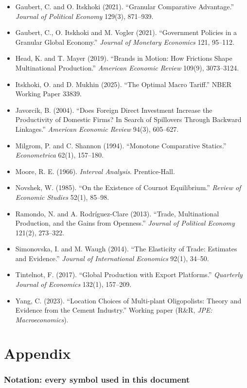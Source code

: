 \documentclass[11pt]{article}
\theoremstyle{plain}
\theoremstyle{remark}
\theoremstyle{definition}
\begin{document}
\begin{itemize}[leftmargin=1.4em]
\emph{Econometrica} 70(5), 1741--1779.
\item Gaubert, C. and O. Itskhoki (2021). ``Granular Comparative Advantage.''
\emph{Journal of Political Economy} 129(3), 871--939.
\item Gaubert, C., O. Itskhoki and M. Vogler (2021). ``Government Policies in a
Granular Global Economy.'' \emph{Journal of Monetary Economics} 121, 95--112.
\item Head, K. and T. Mayer (2019). ``Brands in Motion: How Frictions Shape
Multinational Production.'' \emph{American Economic Review} 109(9), 3073--3124.
\item Itskhoki, O. and D. Mukhin (2025). ``The Optimal Macro Tariff.'' NBER Working
Paper 33839.
\item Javorcik, B. (2004). ``Does Foreign Direct Investment Increase the Productivity
of Domestic Firms? In Search of Spillovers Through Backward Linkages.''
\emph{American Economic Review} 94(3), 605--627.
\item Milgrom, P. and C. Shannon (1994). ``Monotone Comparative Statics.''
\emph{Econometrica} 62(1), 157--180.
\item Moore, R. E. (1966). \emph{Interval Analysis}. Prentice-Hall.
\item Novshek, W. (1985). ``On the Existence of Cournot Equilibrium.''
\emph{Review of Economic Studies} 52(1), 85--98.
\item Ramondo, N. and A. Rodr\'iguez-Clare (2013). ``Trade, Multinational Production,
and the Gains from Openness.'' \emph{Journal of Political Economy} 121(2), 273--322.
\item Simonovska, I. and M. Waugh (2014). ``The Elasticity of Trade: Estimates and
Evidence.'' \emph{Journal of International Economics} 92(1), 34--50.
\item Tintelnot, F. (2017). ``Global Production with Export Platforms.''
\emph{Quarterly Journal of Economics} 132(1), 157--209.
\item Yang, C. (2023). ``Location Choices of Multi-plant Oligopolists: Theory and
Evidence from the Cement Industry.'' Working paper (R\&R, \emph{JPE: Macroeconomics}).
\end{itemize}

\newpage
\appendix
\part*{Appendix}

\section{Notation: every symbol used in this document}
\label{sec:notation}
\end{document}
